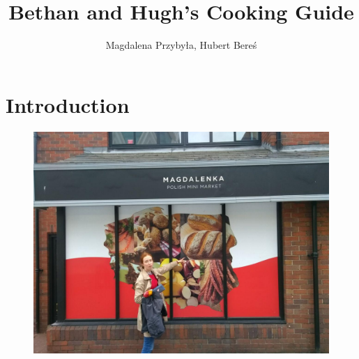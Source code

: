 \documentclass[%
titlepage,
b5paper,
twoside,
11pt
]{book}
\begin{document}
\frontmatter
\title{Bethan and Hugh's Cooking Guide}
\author{Magdalena Przybyła, Hubert Bereś}

\maketitle
\thispagestyle{empty}
\newpage

\tableofcontents

\mainmatter
\chapter{Introduction}
\begin{figure}[h]
	\centering
	\includegraphics[width=\textwidth]{pic/magdalenka}
\end{figure}


\end{document}
